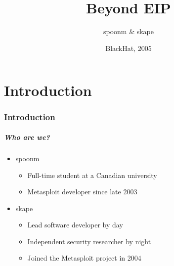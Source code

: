 \documentclass{beamer}
\title{Beyond EIP}
\author[spoonm \& skape] {spoonm \& skape}
\date[BlackHat 2005] {BlackHat, 2005}
\newenvironment{sitemize}{\vspace{1mm}\begin{itemize}\itemsep 4pt\small}{\end{itemize}}
\begin{document}
\begin{frame}[t]
  \titlepage
\end{frame}

\part{Introduction}

\section{Introduction}
\begin{frame}[t]
    \frametitle{Who are we?}

    \begin{sitemize}
        \item spoonm
        \begin{sitemize}
            \item Full-time student at a Canadian university
            \item Metasploit developer since late 2003
        \end{sitemize}

        \item skape
        \begin{sitemize}
            \item Lead software developer by day
            \item Independent security researcher by night
            \item Joined the Metasploit project in 2004
        \end{sitemize}
    \end{sitemize}
\end{frame}
\end{document}
